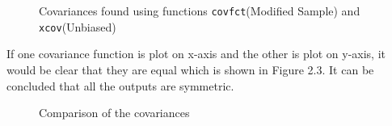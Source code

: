 \begin{figure}[H]
    \centering
    \qquad
    \caption{Covariances found using functions \texttt{covfct}(Modified Sample) and \texttt{xcov}(Unbiased)}
\end{figure}
\noindent If one covariance function is plot on x-axis and the other is plot on y-axis, it would be clear that they are equal which is shown in Figure 2.3. It can be concluded that all the outputs are symmetric.
\begin{figure}[H]
    \centering
    \qquad
   \caption{Comparison of the covariances}
   \end{figure}
